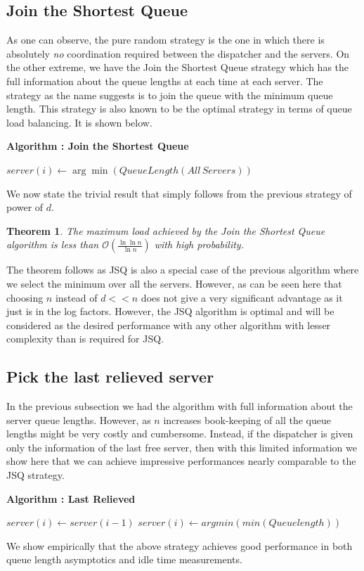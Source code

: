 \documentclass[a4paper,english,12pt]{article}
\newtheorem{theorem}{Theorem}
\begin{document}
\subsection{Join the Shortest Queue}
As one can observe, the pure random strategy is the one in which there is absolutely \textit{no} coordination required between the dispatcher and the servers. On the other extreme, we have the Join the Shortest Queue strategy which has the full information about the queue lengths at each time at each server. The strategy as the name suggests is to join the queue with the minimum queue length. This strategy is also known to be the optimal strategy in terms of queue load balancing. It is shown below.  
\begin{algorithm}
\textbf{{Algorithm : Join the Shortest Queue}}\label{euclid3}
\begin{algorithmic}[1]
\State $server(i) \gets \arg\min(QueueLength(All\,Servers))$
\EndFor
\State \Return 
\end{algorithmic}
\end{algorithm}
We now state the trivial result that simply follows from the previous strategy of power of $d$. 
\begin{theorem}
The maximum load achieved by the Join the Shortest Queue algorithm is less than $\mathcal{O}(\frac{\ln \ln n}{\ln n})$ with high probability.
\end{theorem}
The theorem follows as JSQ is also a special case of the previous algorithm where we select the minimum over all the servers. However, as can be seen here that choosing $n$ instead of $d<<n$ does not give a very significant advantage as it just is in the log factors. However, the JSQ algorithm is optimal and will be considered as the desired performance with any other algorithm with lesser complexity than is required for JSQ.
\subsection{Pick the last relieved server}

In the previous subsection we had the algorithm with full information about the server queue lengths. However, as $n$ increases book-keeping of all the queue lengths might be very costly and cumbersome. Instead, if the dispatcher is given only the information of the last free server, then with this limited information we show here that we can achieve impressive performances nearly comparable to the JSQ strategy.
\begin{algorithm}
\textbf{{Algorithm : Last Relieved}}\label{euclid4}
\begin{algorithmic}[1]
\State $ server(i) \gets server(i-1) $
\Else
\State $ server(i) \gets argmin (min(Queuelength)) $
\EndIf
\EndFor
\State \Return 
\end{algorithmic}
\end{algorithm}
We show empirically that the above strategy achieves good performance in both queue length asymptotics and idle time measurements.
\end{document}
